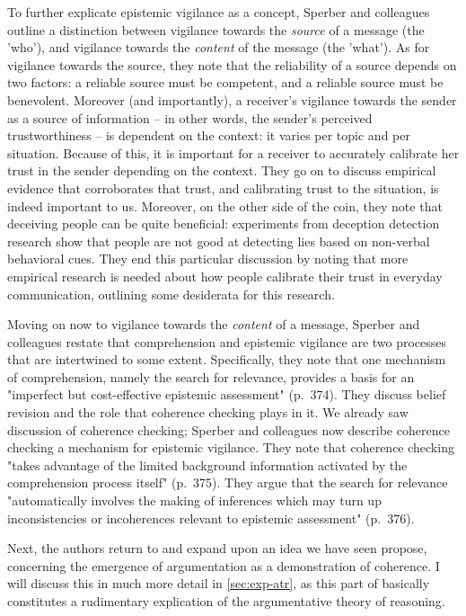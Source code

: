 To further explicate epistemic vigilance as a concept, Sperber and colleagues outline a distinction between vigilance towards the \emph{source} of a message (the 'who'), and vigilance towards the \emph{content} of the message (the 'what').
As for vigilance towards the source, they note that the reliability of a source depends on two factors: a reliable source must be competent, and a reliable source must be benevolent.
Moreover (and importantly), a receiver's vigilance towards the sender as a source of information -- in other words, the sender's perceived trustworthiness -- is dependent on the context: it varies per topic and per situation.
Because of this, it is important for a receiver to accurately calibrate her trust in the sender depending on the context.
They go on to discuss empirical evidence that corroborates that trust, and calibrating trust to the situation, is indeed important to us.
Moreover, on the other side of the coin, they note that deceiving people can be quite beneficial: experiments from deception detection research show that people are not good at detecting lies based on non-verbal behavioral cues.
They end this particular discussion by noting that more empirical research is needed about how people calibrate their trust in everyday communication, outlining some desiderata for this research.


Moving on now to vigilance towards the \emph{content} of a message, Sperber and colleagues restate that comprehension and epistemic vigilance are two processes that are intertwined to some extent. Specifically, they note that one mechanism of comprehension, namely the search for relevance, provides a basis for an "imperfect but cost-effective epistemic assessment" (p.~374).
They discuss belief revision and the role that coherence checking plays in it. We already saw  discussion of coherence checking; Sperber and colleagues now describe coherence checking a mechanism for epistemic vigilance. They note that coherence checking "takes advantage of the limited background information activated by the comprehension process itself" (p.~375). They argue that the search for relevance "automatically involves the making of inferences which may turn up inconsistencies or incoherences relevant to epistemic assessment" (p.~376).

Next, the authors return to and expand upon an idea we have seen \citet{Sperber01} propose, concerning the emergence of argumentation as a demonstration of coherence. I will discuss this in much more detail in \cref{sec:exp-atr}, as this part of \citet{Sperber10} basically constitutes a rudimentary explication of the argumentative theory of reasoning.

